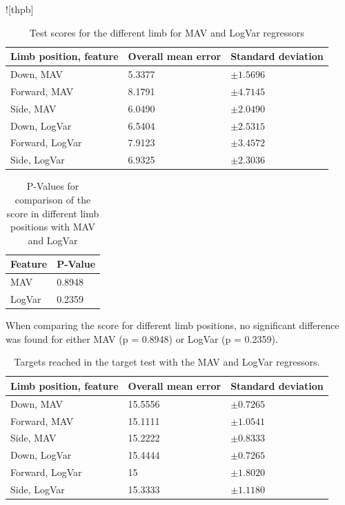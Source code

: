 	\begin{table}![thpb]
		\begin{center}
			\begin{tabular}{l l l}
				\hline
				\textbf{Limb position, feature} & \textbf{Overall mean error} & \textbf{Standard deviation}\\
				\hline
				Down, MAV & 5.3377 & $\pm 1.5696$ \\
				Forward, MAV & 8.1791 & $\pm 4.7145$ \\
				Side, MAV & 6.0490 & $\pm 2.0490$ \\
				Down, LogVar & 6.5404 & $\pm 2.5315$ \\
				Forward, LogVar & 7.9123 & $\pm 3.4572$ \\
				Side, LogVar & 6.9325 & $\pm 2.3036$ \\
				\hline
			\end{tabular}
			\caption{Test scores for the different limb for MAV and LogVar regressors}
		\end{center}
	\end{table}
	\begin{table}[!thpb]
		\begin{center}
			\begin{tabular}{l l}
				\hline
				\textbf{Feature} & \textbf{P-Value}\\
				\hline
				MAV & 0.8948 \\
				LogVar & 0.2359 \\
				\hline
			\end{tabular}
			\caption{P-Values for comparison of the score in different limb positions with MAV and LogVar}
		\end{center}
	\end{table}
	
	When comparing the score for different limb positions, no significant difference was found for either MAV (p = 0.8948) or LogVar (p = 0.2359).
	
	\begin{table}[!thpb]
		\begin{center}
			\begin{tabular}{l l l}
				\hline
				\textbf{Limb position, feature} & \textbf{Overall mean error} & \textbf{Standard deviation}\\
				\hline
				Down, MAV & 15.5556 & $\pm 0.7265$ \\
				Forward, MAV & 15.1111 & $\pm 1.0541$ \\
				Side, MAV & 15.2222 & $\pm 0.8333$ \\
				Down, LogVar & 15.4444 & $\pm 0.7265$ \\
				Forward, LogVar & 15 & $\pm 1.8020$ \\
				Side, LogVar & 15.3333 & $\pm 1.1180$ \\
				\hline
			\end{tabular}
			\caption{Targets reached in the target test with the MAV and LogVar regressors.}
		\end{center}
	\end{table}
	
